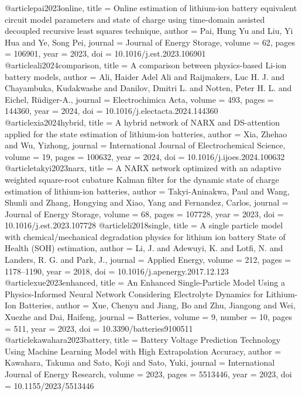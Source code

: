 @article{pai2023online,
	title   = {Online estimation of lithium-ion battery equivalent circuit model parameters and state of charge using time-domain assisted decoupled recursive least squares technique},
	author  = {Pai, Hung Yu and Liu, Yi Hua and Ye, Song Pei},
	journal = {Journal of Energy Storage},
	volume  = {62},
	pages   = {106901},
	year    = {2023},
	doi     = {10.1016/j.est.2023.106901}
}
@article{ali2024comparison,
	title   = {A comparison between physics-based Li-ion battery models},
	author  = {Ali, Haider Adel Ali and Raijmakers, Luc H. J. and Chayambuka, Kudakwashe and Danilov, Dmitri L. and Notten, Peter H. L. and Eichel, R{\"u}diger-A.},
	journal = {Electrochimica Acta},
	volume  = {493},
	pages   = {144360},
	year    = {2024},
	doi     = {10.1016/j.electacta.2024.144360}
}
@article{xia2024hybrid,
	title   = {A hybrid network of NARX and DS-attention applied for the state estimation of lithium-ion batteries},
	author  = {Xia, Zhehao and Wu, Yizhong},
	journal = {International Journal of Electrochemical Science},
	volume  = {19},
	pages   = {100632},
	year    = {2024},
	doi     = {10.1016/j.ijoes.2024.100632}
}
@article{takyi2023narx,
	title   = {A NARX network optimized with an adaptive weighted square-root cubature Kalman filter for the dynamic state of charge estimation of lithium-ion batteries},
	author  = {Takyi-Aninakwa, Paul and Wang, Shunli and Zhang, Hongying and Xiao, Yang and Fernandez, Carlos},
	journal = {Journal of Energy Storage},
	volume  = {68},
	pages   = {107728},
	year    = {2023},
	doi     = {10.1016/j.est.2023.107728}
}
@article{li2018single,
	title   = {A single particle model with chemical/mechanical degradation physics for lithium ion battery State of Health (SOH) estimation},
	author  = {Li, J. and Adewuyi, K. and Lotfi, N. and Landers, R. G. and Park, J.},
	journal = {Applied Energy},
	volume  = {212},
	pages   = {1178--1190},
	year    = {2018},
	doi     = {10.1016/j.apenergy.2017.12.123}
}
@article{xue2023enhanced,
	title   = {An Enhanced Single-Particle Model Using a Physics-Informed Neural Network Considering Electrolyte Dynamics for Lithium-Ion Batteries},
	author  = {Xue, Chenyu and Jiang, Bo and Zhu, Jiangong and Wei, Xuezhe and Dai, Haifeng},
	journal = {Batteries},
	volume  = {9},
	number  = {10},
	pages   = {511},
	year    = {2023},
	doi     = {10.3390/batteries9100511}
}
@article{kawahara2023battery,
	title   = {Battery Voltage Prediction Technology Using Machine Learning Model with High Extrapolation Accuracy},
	author  = {Kawahara, Takuma and Sato, Koji and Sato, Yuki},
	journal = {International Journal of Energy Research},
	volume  = {2023},
	pages   = {5513446},
	year    = {2023},
	doi     = {10.1155/2023/5513446}
}
